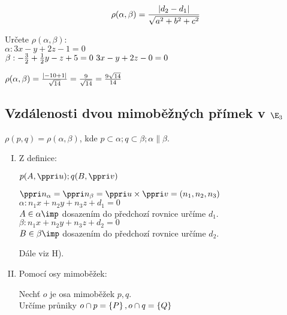 $$\rho (\alpha,\beta) = \frac{|d_2-d_1|}{\sqrt{a^2+b^2+c^2}}$$

\Pr Určete $\rho(\alpha,\beta)$:\\
$\alpha : 3x-y+2z-1=0$\\
$\beta  : -\frac32+\frac12y-z+5=0 ~ 3x-y+2z-0=0$

$\rho(\alpha,\beta) = \frac{|-10+1|}{\sqrt{14}} = \frac{9}{\sqrt{14}}=\frac{9\sqrt{14}}{14}$

\subsection{Vzdálenosti dvou mimoběžných přímek v $\E_3$}

\Poz $\rho(p,q) = \rho(\alpha,\beta)$, kde $p\subset \alpha; q\subset\beta; \alpha\parallel \beta$.

\begin{enumerate}[I. způsob:]
	\item Z definice:

		$p(A,\ve u);q(B,\ve v)$

		$\ve{n_\alpha} = \ve{n_\beta} = \ve{u}\times \ve v = (n_1,n_2,n_3)$\\
		$\alpha: n_1x+n_2y+n_3z+d_1=0$\\
		$A\in \alpha \imp$ dosazením do předchozí rovnice určíme $d_1$.\\
		$\beta: n_1x+n_2y+n_3z+d_2=0$\\
		$B\in \beta \imp$ dosazením do předchozí rovnice určíme $d_2$.

		Dále viz H).

	\item Pomocí osy mimoběžek:

		Nechť $o$ je osa mimoběžek $p,q$.\\
		Určíme průniky
		$o\cap p = \left\{{P}\right\}, o\cap q = \left\{{Q}\right\}$
\end{enumerate}

